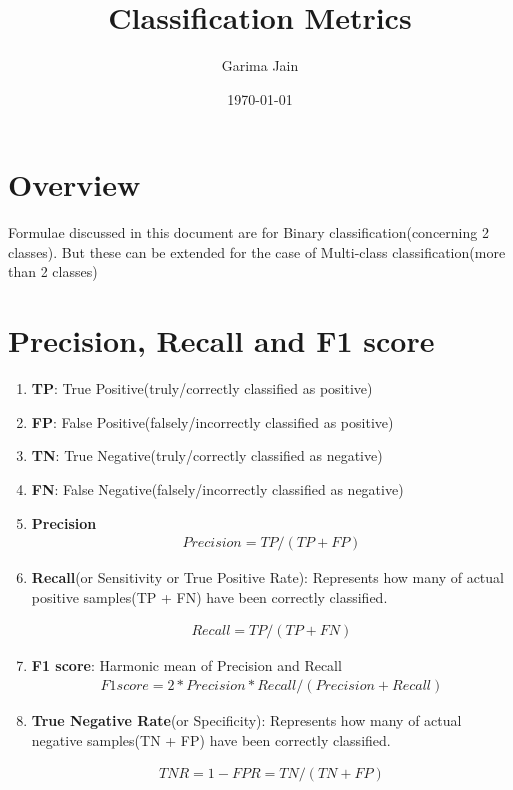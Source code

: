 \documentclass[12pt, letterpaper, twoside]{article}
\begin{document}
	
\title{Classification Metrics}
\author{Garima Jain}
\date{\today}
\begin{titlepage}
	\maketitle
\end{titlepage}

\section{Overview}

Formulae discussed in this document are for Binary classification(concerning 2 classes). But these can be extended for the case of Multi-class classification(more than 2 classes)

\section{Precision, Recall and F1 score}

\begin{enumerate}
	\item \textbf{TP}: True Positive(truly/correctly classified as positive)
	\item \textbf{FP}: False Positive(falsely/incorrectly classified as positive)
	\item \textbf{TN}: True Negative(truly/correctly classified as negative)
	\item \textbf{FN}: False Negative(falsely/incorrectly classified as negative)
	\item \textbf{Precision}
	\begin{align}
		Precision = TP / (TP + FP)
	\end{align}
	
	\item \textbf{Recall}(or Sensitivity or True Positive Rate): Represents how many of actual positive samples(TP + FN) have been correctly classified.
	
	\begin{align}
		Recall = TP / (TP + FN)
	\end{align}
	
	\item \textbf{F1 score}: Harmonic mean of Precision and Recall
	\begin{align}
		F1 score = 2 * Precision * Recall / (Precision + Recall)
	\end{align}
	
	\item \textbf{True Negative Rate}(or Specificity): Represents how many of actual negative samples(TN + FP) have been correctly classified.
	
	\begin{align}
		TNR = 1 - FPR =  TN / (TN + FP)
	\end{align}
	
\end{enumerate}
\end{document}

